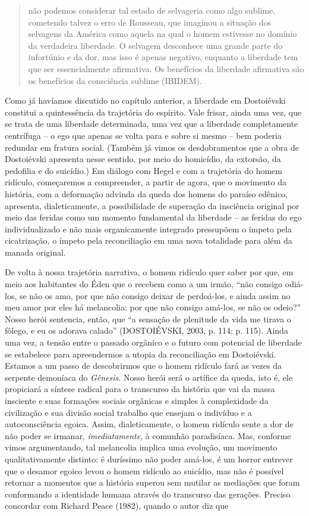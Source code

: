 \begin{quote}
não podemos considerar tal estado de selvageria como algo sublime,
cometendo talvez o erro de Rousseau, que imaginou a situação dos
selvagens da América como aquela na qual o homem estivesse no domínio da
verdadeira liberdade. O selvagem desconhece uma grande parte do
infortúnio e da dor, mas isso é apenas negativo, enquanto a liberdade
tem que ser essencialmente afirmativa. Os benefícios da liberdade
afirmativa são os benefícios da consciência sublime (IBIDEM).
\end{quote}

Como já havíamos discutido no capítulo anterior, a liberdade em
Dostoiévski constitui a quintessência da trajetória do espírito. Vale
frisar, ainda uma vez, que se trata de uma liberdade determinada, uma
vez que a liberdade completamente centrífuga -- o ego que apenas se
volta para e sobre si mesmo -- bem poderia redundar em fratura social.
(Também já vimos os desdobramentos que a obra de Dostoiévski apresenta
nesse sentido, por meio do homicídio, da extorsão, da pedofilia e do
suicídio.) Em diálogo com Hegel e com a trajetória do homem ridículo,
começaremos a compreender, a partir de agora, que o movimento da
história, com a deformação advinda da queda dos homens do paraíso
edênico, apresenta, dialeticamente, a possibilidade de superação da
insciência original por meio das feridas como um momento fundamental da
liberdade -- as feridas do ego individualizado e não mais organicamente
integrado pressupõem o ímpeto pela cicatrização, o ímpeto pela
reconciliação em uma nova totalidade para além da manada original.

De volta à nossa trajetória narrativa, o homem ridículo quer saber por
que, em meio aos habitantes do Éden que o recebem como a um irmão, ``não
consigo odiá-los, se não os amo, por que não consigo deixar de
perdoá-los, e ainda assim no meu amor por eles há melancolia: por que
não consigo amá-los, se não os odeio?'' Nosso herói sentencia, então,
que ``a sensação de plenitude da vida me tirava o fôlego, e eu os
adorava calado'' (DOSTOIÉVSKI, 2003, p. 114; p. 115). Ainda uma vez, a
tensão entre o passado orgânico e o futuro com potencial de liberdade se
estabelece para apreendermos a utopia da reconciliação em Dostoiévski.
Estamos a um passo de descobrirmos que o homem ridículo fará as vezes da
serpente demoníaca do \emph{Gênesis}. Nosso herói será o artífice da
queda, isto é, ele propiciará a síntese radical para o transcurso da
história que vai da massa insciente e suas formações sociais orgânicas e
simples à complexidade da civilização e sua divisão social trabalho que
ensejam o indivíduo e a autoconsciência egoica. Assim, dialeticamente, o
homem ridículo sente a dor de não poder se irmanar,
\emph{imediatamente}, à comunhão paradisíaca. Mas, conforme vimos
argumentando, tal melancolia implica uma evolução, um movimento
qualitativamente distinto: é duríssimo não poder amá-los, é um horror
entrever que o desamor egoico levou o homem ridículo ao suicídio, mas
não é possível retornar a momentos que a história superou sem mutilar as
mediações que foram conformando a identidade humana através do
transcurso das gerações. Preciso concordar com Richard Peace (1982),
quando o autor diz que

